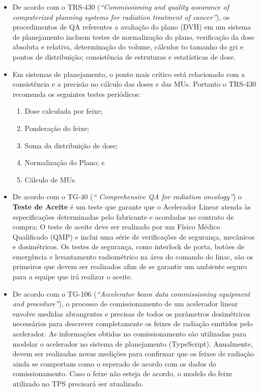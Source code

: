 \documentclass[11pt,a4paper]{article}
\newcounter{exemplo}
\begin{document}
\begin{exemplo}[Qualidade]
\begin{itemize}
        \item De acordo com o TRS-430 (\textit{``Commissioning and quality assurance of computerized planning systems for radiation treatment of cancer''}), os procedimentos de QA referentes a avaliação do plano (DVH) em um sistema de planejamento incluem testes de normalização do plano, verificação da dose absoluta e relativa, determinação do volume, cálculos to tamanho do gri e pontos de distribuição; consistência de estruturas e estatísticas de dose.
        
        \item Em sistemas de planejamento, o ponto mais crítico está relacionado com a consistência e a precisão no cálculo das doses e das MUs. Portanto o TRS-430 recomenda os seguintes testes periódicos: 
            \begin{enumerate}[label=\textcolor{CarnationPink}{\roman*.}]
                \item Dose calculada por feixe;
                \item Ponderação do feixe;
                \item Soma da distribuição de dose; 
                \item Normalização do Plano; e
                \item Cálculo de MUs.
            \end{enumerate}

        \item De acordo com o TG-40 (\textit{`` Comprehensive QA for radiation oncology''}) o \textbf{Teste de Aceite} é um teste que garante que o Acelerador Linear atenda às especificações determinadas pelo fabricante e acordadas no contrato de compra; O teste de aceite deve ser realizado por um Físico Médico Qualificado (QMP) e inclui uma série de verificações de segurança, mecânicos e dosimétricos. Os testes de segurança, como interlock de porta, botões de emergência e levantamento radiométrico na área do comando do linac, são os primeiros que devem ser realizados afim de se garantir um ambiente seguro para a equipe que irá realizar o aceite.
        
        \item De acordo com o TG-106 (\textit{``Accelerator beam data commissioning equipment and procedure''}), o processo de comissionamento de um acelerador linear envolve medidas abrangentes e precisas de todos os parâmetros dosimétricos necessários para descrever completamente os feixes de radiação emitidos pelo acelerador. As informações obtidas no comissionamento são utilizadas para modelar o acelerador no sistema de planejamento (TypeScript). Anualmente, devem ser realizadas novas medições para confirmar que os feixes de radiação ainda se comportam como o esperado de acordo com os dados do comissionamento. Caso o feixe não esteja de acordo, o modelo do feixe utilizado no TPS precisará ser atualizado.
                

\end{itemize}
\end{exemplo}
\end{document}
